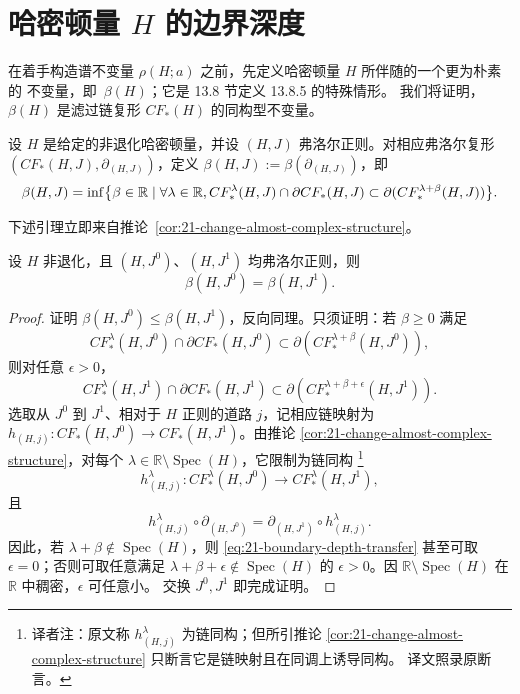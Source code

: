 \section{\texorpdfstring{哈密顿量 $H$ 的边界深度}{哈密顿量 H 的边界深度}}
\label{sec:hamiltonian-boundary-depth}

在着手构造谱不变量 $\rho(H;a)$ 之前，先定义哈密顿量 $H$ 所伴随的一个更为朴素的
不变量，即\termBoundaryDepth{}~$\beta(H)$；它是 13.8 节定义 13.8.5 的特殊情形。
我们将证明，$\beta(H)$ 是滤过链复形 $CF_*(H)$ 的同构型不变量。

\begin{definition}[边界深度]
\label{def:21-hamiltonian-boundary-depth}
设 $H$ 是给定的非退化哈密顿量，并设 $(H,J)$ 弗洛尔正则。对相应弗洛尔复形
$(CF_*(H,J),\partial_{(H,J)})$，定义
$\beta(H,J):=\beta(\partial_{(H,J)})$，即
\[
 \beta(H,J)=\inf\bigl\{\beta\in\mathbb R\mid
 \forall\lambda\in\mathbb R,\space
 CF_*^\lambda(H,J)\cap\partial CF_*(H,J)
 \subset\partial(CF_*^{\lambda+\beta}(H,J))\bigr\}.
\]
\end{definition}

下述引理立即来自推论~\ref{cor:21-change-almost-complex-structure}。

\begin{lemma}
\label{lem:21-boundary-depth-independent-j}
设 $H$ 非退化，且 $(H,J^0)$、$(H,J^1)$ 均弗洛尔正则，则
\[
 \beta(H,J^0)=\beta(H,J^1).
\]
\end{lemma}

\begin{proof}
证明 $\beta(H,J^0)\leq\beta(H,J^1)$，反向同理。只须证明：若 $\beta\geq0$ 满足
\[
 CF_*^\lambda(H,J^0)\cap\partial CF_*(H,J^0)
 \subset\partial(CF_*^{\lambda+\beta}(H,J^0)),
\]
则对任意 $\epsilon>0$，
\begin{equation}
 CF_*^\lambda(H,J^1)\cap\partial CF_*(H,J^1)
 \subset\partial(CF_*^{\lambda+\beta+\epsilon}(H,J^1)).
 \label{eq:21-boundary-depth-transfer}
\end{equation}
选取从 $J^0$ 到 $J^1$、相对于 $H$ 正则的道路 $j$，记相应链映射为
$h_{(H,j)}:CF_*(H,J^0)\to CF_*(H,J^1)$。由推论
\ref{cor:21-change-almost-complex-structure}，对每个
$\lambda\in\mathbb R\setminus\operatorname{Spec}(H)$，它限制为链同构
\footnote{译者注：原文称 $h_{(H,j)}^\lambda$ 为链同构；但所引推论
\ref{cor:21-change-almost-complex-structure} 只断言它是链映射且在同调上诱导同构。
译文照录原断言。}
\[
 h_{(H,j)}^\lambda:CF_*^\lambda(H,J^0)\longrightarrow CF_*^\lambda(H,J^1),
\]
且
\[
 h_{(H,j)}^\lambda\circ\partial_{(H,J^0)}
 =\partial_{(H,J^1)}\circ h_{(H,j)}^\lambda.
\]
因此，若 $\lambda+\beta\notin\operatorname{Spec}(H)$，则
\eqref{eq:21-boundary-depth-transfer} 甚至可取 $\epsilon=0$；否则可取任意满足
$\lambda+\beta+\epsilon\notin\operatorname{Spec}(H)$ 的 $\epsilon>0$。因
$\mathbb R\setminus\operatorname{Spec}(H)$ 在 $\mathbb R$ 中稠密，$\epsilon$ 可任意小。
交换 $J^0,J^1$ 即完成证明。
\end{proof}

